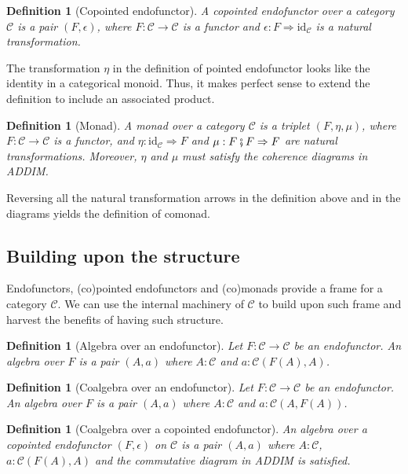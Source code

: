 \documentclass[12pt,a4paper,openright,twoside]{report}
\theoremstyle{plain}
\newtheorem{definition}[proposition]{Definition}
\theoremstyle{definition}
\begin{document}
\begin{definition}[Copointed endofunctor]\label{def: copointend}
  A copointed endofunctor over a category $\mathcal{C}$ is a pair $(F, \epsilon)$, where $F: \mathcal{C} \to \mathcal{C}$ is a functor and $\epsilon: F \Rightarrow \mathrm{id}_{\mathcal{C}}$ is a natural transformation. 
\end{definition}

The transformation $\eta$ in the definition of pointed endofunctor looks like the identity in a categorical monoid. Thus, it makes perfect sense to extend the definition to include an associated product.

\begin{definition}[Monad]
  \label{def: monad}
  A monad over a category $\mathcal{C}$ is a triplet $(F, \eta, \mu)$, where $F: \mathcal{C} \to \mathcal{C}$ is a functor, and $\eta: \mathrm{id}_{\mathcal{C}} \Rightarrow F$  and $\mu: F \fatsemi F \Rightarrow F$ are natural transformations. Moreover, $\eta$ and $\mu$ must satisfy the coherence diagrams in ADDIM.  
\end{definition}

Reversing all the natural transformation arrows in the definition above and in the diagrams yields the definition of comonad.


\subsection{Building upon the structure}

Endofunctors, (co)pointed endofunctors and (co)monads provide a frame for a category $\mathcal{C}$. We can use the internal machinery of $\mathcal{C}$ to build upon such frame and harvest the benefits of having such structure.

\begin{definition}[Algebra over an endofunctor]
  \label{def: endalg}
  Let $F: \mathcal{C} \to \mathcal{C}$ be an endofunctor. An algebra over $F$ is a pair $(A,a)$ where $A: \mathcal{C}$ and $a:\mathcal{C}(F(A),A)$.
\end{definition}

\begin{definition}[Coalgebra over an endofunctor]
  \label{def: endcoalg}
  Let $F: \mathcal{C} \to \mathcal{C}$ be an endofunctor. An algebra over $F$ is a pair $(A,a)$ where $A: \mathcal{C}$ and $a:\mathcal{C}(A,F(A))$.
\end{definition}

\begin{definition}[Coalgebra over a copointed endofunctor]
  \label{def: copendcoalg}
  An algebra over a copointed endofunctor $(F, \epsilon)$ on $\mathcal{C}$ is a pair $(A,a)$ where $A: \mathcal{C}$, $a:\mathcal{C}(F(A),A)$ and the commutative diagram in ADDIM is satisfied.
\end{definition}
\end{document}
